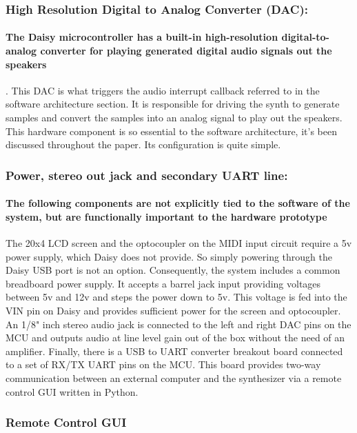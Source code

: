 \documentclass[acmlarge,screen]{acmart}
\begin{document}
	\subsubsection{High Resolution Digital to Analog Converter (DAC):} 
	\paragraph{The Daisy microcontroller has a built-in high-resolution digital-to-analog converter for playing generated digital audio signals out the speakers}. This DAC is what triggers the audio interrupt callback referred to in the software architecture section. It is responsible for driving the synth to generate samples and convert the samples into an analog signal to play out the speakers. This hardware component is so essential to the software architecture, it's been discussed throughout the paper. Its configuration is quite simple.
	
	\subsubsection{Power, stereo out jack and secondary UART line:}
	\paragraph{The following components are not explicitly tied to the software of the system, but are functionally important to the hardware prototype} The 20x4 LCD screen and the optocoupler on the MIDI input circuit require a 5v power supply, which Daisy does not provide. So simply powering through the Daisy USB port is not an option. Consequently, the system includes a common breadboard power supply. It accepts a barrel jack input providing voltages between 5v and 12v and steps the power down to 5v. This voltage is fed into the VIN pin on Daisy and provides sufficient power for the screen and optocoupler. An 1/8" inch stereo audio jack is connected to the left and right DAC pins on the MCU and outputs audio at line level gain out of the box without the need of an amplifier. Finally, there is a USB to UART converter breakout board connected to a set of RX/TX UART pins on the MCU. This board provides two-way communication between an external computer and the synthesizer via a remote control GUI written in Python.
	
	\subsubsection{Remote Control GUI}
\end{document}
